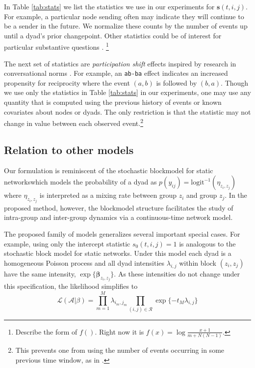 In Table \ref{tab:stats} we list the statistics we use in our experiments for  $\mathbf{s}(t,i,j)$.
For example, a particular node sending often may indicate they will continue to be a sender in the future.
We normalize these counts by the number of events up until a dyad's prior changepoint. %
Other statistics could be of interest for particular substantive questions \cite{Butts2008,Vu2011}.  \footnote{Describe the form of $f()$.  Right now it is $f(x) = \log \frac{x+1}{m + N(N-1)}$.}

The next set of statistics are \emph{participation shift} effects inspired by research in conversational norms \cite{Gibson2003}.
For example, an \texttt{ab-ba} effect indicates an increased propensity for reciprocity where the event $(a,b)$ is followed by $(b,a)$.
Though we use only the statistics in Table \ref{tab:stats} in our experiments, one may use any quantity that is computed using the previous history of events or known covariates about nodes or dyads.
The only restriction is that the statistic may not change in value between each observed event.\footnote{This prevents one from using the number of events occurring in some previous time window, as in \cite{Gunawardana2011}.}

\subsection{Relation to other models}

Our formulation is reminiscent of the stochastic blockmodel \cite{Nowicki2001,Kemp} for static networkswhich models the probability of a dyad as $p(y_{ij}) =\mbox{logit}^{-1}( \eta_{z_i,z_j})$ where $\eta_{z_i,z_j}$ is interpreted as a mixing rate between group $z_i$ and group $z_j$.
In the proposed method, however, the blockmodel structure facilitates the study of intra-group and inter-group dynamics via a continuous-time network model.

The proposed family of models generalizes several important special cases.
For example,  using only the intercept statistic $s_0(t,i,j) = 1$ is analogous to the stochastic block model for static networks.
Under this model each dyad is a homogeneous Poisson process and all dyad intensities $\lambda_{i,j}$ within block $(z_i,z_j)$ have the same intensity, $\exp\{\boldsymbol{\beta}_{z_i,z_j}\}$.
As these intensities do not change under this specification, the likelihood simplifies to
$$\mathcal{L}(\mathcal{A}|\beta) = \prod_{m=1}^M \lambda_{i_m,j_m} \prod_{(i,j) \in \mathcal{R}} \exp\{-t_M \lambda_{i,j}\}$$


